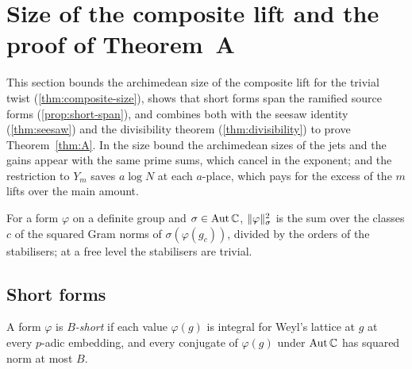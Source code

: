 \section{Size of the composite lift and the proof of Theorem~A}\label{sec:size}

This section bounds the archimedean size of the composite lift for the trivial twist (\cref{thm:composite-size}), shows that
short forms span the ramified source forms (\cref{prop:short-span}), and combines both with the seesaw identity
(\cref{thm:seesaw}) and the divisibility theorem (\cref{thm:divisibility}) to prove Theorem~\ref{thm:A}. In the size bound
the archimedean sizes of the jets and the gains appear with the same prime sums, which cancel in the exponent; and the
restriction to $Y_m$ saves $a\log N$ at each $a$-place, which pays for the excess of the $m$ lifts over the main amount.

For a form $\varphi$ on a definite group and $\sigma\in\operatorname{Aut}\mathbb{C}$, $\lVert \varphi\rVert_\sigma^2$ is the sum over the classes $c$ of the squared Gram norms of
$\sigma(\varphi(g_c))$, divided by the orders of the stabilisers; at a free level the stabilisers are trivial.

\subsection{Short forms}\label{ss:short-forms}
A form $\varphi$ is \emph{$B$-short} if each value $\varphi(g)$ is integral for Weyl's lattice at $g$ at every $p$-adic embedding, and every conjugate
of $\varphi(g)$ under $\operatorname{Aut}\mathbb{C}$ has squared norm at most $B$.


